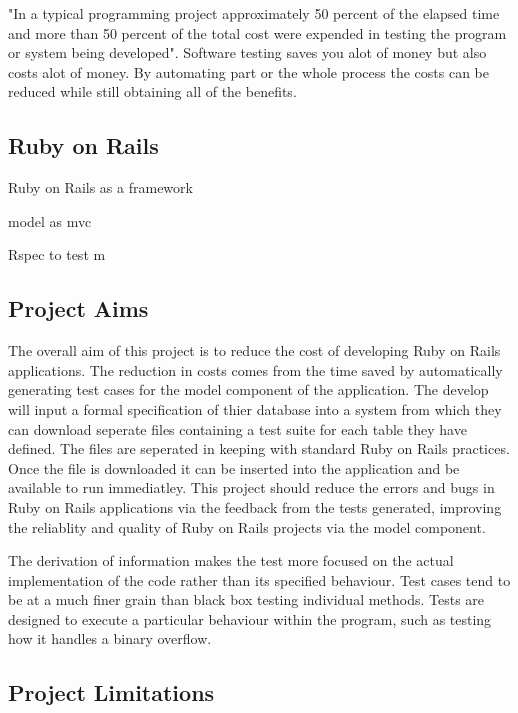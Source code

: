 \documentclass[a4paper,12pt]{article}
\begin{document}
\par "In a typical programming project approximately 50 percent of the elapsed time and more than 50 percent of the total cost were expended in testing the program or system being developed"\cite{myers2011art}. Software testing saves you alot of money but also costs alot of money. By automating part or the whole process the costs can be reduced while still obtaining all of the benefits.



\subsection{Ruby on Rails}
\par Ruby on Rails as a framework 
\par model as mvc
\par Rspec to test m

\subsection{Project Aims}
\par The overall aim of this project is to reduce the cost of developing Ruby on Rails applications. The reduction in costs comes from the time saved by automatically generating test cases for the model component of the application. The develop will input a formal specification of thier database into a system from which they can download seperate files containing a test suite for each table they have defined. The files are seperated in keeping with standard Ruby on Rails practices. Once the file is downloaded it can be inserted into the application and be available to run immediatley. This project should reduce the errors and bugs in Ruby on Rails applications via the feedback from the tests generated, improving the reliablity and quality of Ruby on Rails projects via the model component.

\par The derivation of information makes the test more focused on the actual implementation of the code rather than its specified behaviour. Test cases tend to be at a much finer grain than black box testing individual methods. Tests are designed to execute a particular behaviour within the program, such as testing how it handles a binary overflow.\cite{nidhra2012blackbox}\cite{young2008software}
\subsection{Project Limitations}
\end{document}
